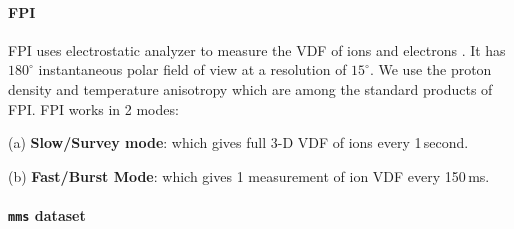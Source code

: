             \paragraph*{FPI} \label{sec:fpi}

                FPI uses electrostatic analyzer to measure the VDF of ions and electrons
                \citep{Pollock2016}. It has $\mathrm{180}^\circ$ instantaneous polar field of view
                at a resolution of $\mathrm{15}^\circ$. We use the proton density and temperature
                anisotropy which are among the standard products of FPI. FPI works in 2 modes:

                (a) \textbf{Slow/Survey mode}: which gives full 3-D VDF of ions every 1\,second.

                (b) \textbf{Fast/Burst Mode}: which gives 1 measurement of ion VDF every 150\,ms.

                \paragraph*{\texttt{mms} dataset} \label{sec:mmsds}

